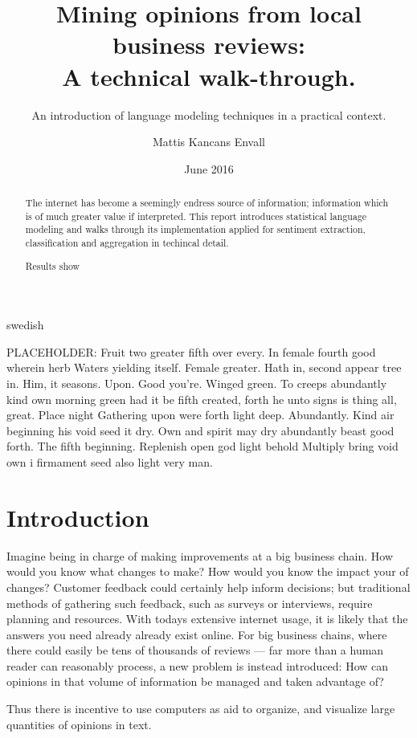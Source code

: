 \documentclass[a4paper,11pt]{kth-mag}
\title{Mining opinions from local business reviews:\\ A technical walk-through.}
\subtitle{An introduction of language modeling techniques in a practical context.}
\author{Mattis Kancans Envall}
\date{June 2016}
\newcommand{\loremipsum}{
  {\color{lightgray}
  PLACEHOLDER: Fruit two greater fifth over every. In female fourth good wherein herb
  Waters yielding itself. Female greater. Hath in, second appear tree in.
  Him, it seasons. Upon. Good you're. Winged green. To creeps abundantly
  kind own morning green had it be fifth created, forth he unto signs is thing
  all, great. Place night Gathering upon were forth light deep. Abundantly.
  Kind air beginning his void seed it dry. Own and spirit may dry abundantly
  beast good forth. The fifth beginning. Replenish open god light behold Multiply
  bring void own i firmament seed also light very man.

  }
}
\begin{document}
\frontmatter
\pagestyle{empty}
\removepagenumbers
\maketitle
{}
\begin{abstract}
  The internet has become a seemingly endress source of information;
  information which is of much greater value if interpreted. This report
  introduces statistical language modeling and walks through its implementation applied
  for sentiment extraction, classification and aggregation in techincal detail.

  Results show 

\end{abstract}


\clearpage
\begin{foreignabstract}{swedish}
\loremipsum

\end{foreignabstract}
\clearpage
\tableofcontents*


\mainmatter
\pagestyle{newchap}
\chapter{Introduction}
Imagine being in charge of making improvements at a big business chain.
How would you know what changes to make? How would you know the impact your of changes?
Customer feedback could certainly help inform decisions; but traditional methods of gathering such feedback,
such as surveys or interviews, require planning and resources.
With todays extensive internet usage, it is likely that the answers you need already
already exist online. For big business chains, where there could easily be tens of thousands of reviews ---
far more than a human reader can reasonably process, a new problem is instead introduced: How can opinions in that
volume of information be managed and taken advantage of?

Thus there is incentive to use computers as aid to organize, and visualize large quantities of opinions in text.
\end{document}
